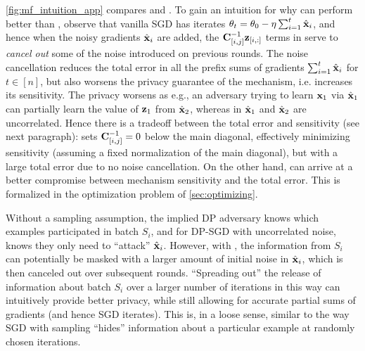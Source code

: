 \documentclass{article}
\begin{document}
\cref{fig:mf_intuition_app} compares \dpsgd and \mfftrl. To gain an intuition for why \mfftrl can perform better than \dpsgd, observe that vanilla SGD has iterates $\theta_t = \theta_0 - \eta \sum_{i=1}^t \hat{\mathbf{x}}_i$, and hence when the noisy gradients $\hat{\mathbf{x}}_i$ are added, the $\mathbf{C}^{-1}_{[i, j]}\mathbf{z}_{[i, :]}$ terms in \mfftrl serve to \emph{cancel out} some of the noise introduced on previous rounds. The noise cancellation reduces the total error in all the prefix sums of gradients $\sum_{i=1}^t \hat{\mathbf{x}}_i$ for $t \in [n]$, but also worsens the privacy guarantee of the mechanism, i.e. increases its sensitivity. The privacy worsens as e.g., an adversary trying to learn $\mathbf{x}_1$ via $\hat{\mathbf{x}}_1$ can partially learn the value of $\mathbf{z}_1$ from $\hat{\mathbf{x}}_2$, whereas in \dpsgd $\hat{\mathbf{x}}_1$ and $\hat{\mathbf{x}}_2$ are uncorrelated. Hence there is a tradeoff between the total error and sensitivity (see next paragraph): \dpsgd sets $\mathbf{C}^{-1}_{[i, j]}= 0$ below the main diagonal, effectively minimizing sensitivity (assuming a fixed normalization of the main diagonal), but with a large total error due to no noise cancellation. On the other hand, \mfftrl can arrive at a better compromise between mechanism sensitivity and the total error. This is formalized in the optimization problem of \cref{sec:optimizing}.

Without a sampling assumption, the implied DP adversary knows which examples participated in batch $S_i$, and for DP-SGD with uncorrelated noise, knows they only need to ``attack'' $\hat{\mathbf{x}}_i$. However, with \mfftrl, the information from $S_i$ can potentially be masked with a larger amount of initial noise in $\hat{\mathbf{x}}_i$, which is then canceled out over subsequent rounds.  ``Spreading out'' the release of information about batch $S_i$ over a larger number of iterations in this way can intuitively provide better privacy, while still allowing for accurate partial sums of gradients (and hence SGD iterates). This is, in a loose sense, similar to the way SGD with sampling ``hides'' information about a particular example at randomly chosen iterations.
\end{document}
